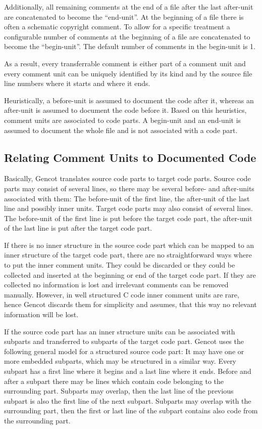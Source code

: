 Additionally, all remaining comments at the end of a file after the last after-unit are concatenated to become the 
``end-unit''. At the beginning of a file there is often a schematic copyright comment. To allow for a specific treatment
a configurable number of comments at the beginning of a file are concatenated to become the ``begin-unit''. The default
number of comments in the begin-unit is 1.

As a result, every transferrable comment is either part of a comment unit and every comment unit
can be uniquely identified by its kind and by the source file line numbers where it starts and where it ends.

Heuristically, a before-unit is assumed to document the code after it, whereas an after-unit is assumed to document
the code before it. Based on this heuristics, comment units are associated to code parts. A begin-unit and an end-unit
is assumed to document the whole file and is not associated with a code part.

\subsection{Relating Comment Units to Documented Code}
\label{design-comments-relate}

Basically, Gencot translates source code parts to target code parts. Source code parts may consist of several lines,
so there may be several before- and after-units associated with them: The before-unit of the first line, the after-unit
of the last line and possibly inner units. Target code parts may also consist of several lines. The before-unit of
the first line is put before the target code part, the after-unit of the last line is put after the target code part.

If there is no inner structure in the source code part which can be mapped to an inner structure of the target code
part, there are no straightforward ways where to put the inner comment units. They could be discarded or they could be
collected and inserted at the beginning or end of the target code part. If they are collected no information is lost 
and irrelevant comments can be removed manually. However, in well structured C code inner comment units are rare,
hence Gencot discards them for simplicity and assumes, that this way no relevant information will be lost.

If the source code part has an inner structure units can be associated with subparts and transferred to subparts of the
target code part. Gencot uses the following general model for a structured source code part: It may have one or more
embedded subparts, which may be structured in a similar way. Every subpart has a first line where it begins and a last 
line where it ends. Before and after a subpart
there may be lines which contain code belonging to the surrounding part. Subparts may overlap, then the last line of 
the previous subpart is also the first line of the next subpart. Subparts may overlap with the surrounding part, then 
the first or last line of the subpart contains also code from the surrounding part.

